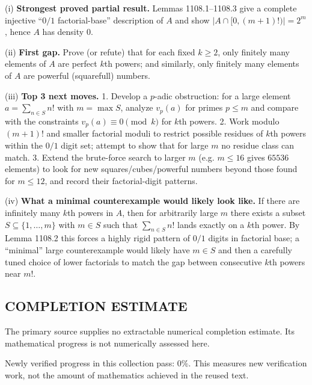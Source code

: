 (i) \textbf{Strongest proved partial result.}
Lemmas 1108.1--1108.3 give a complete injective ``$0/1$ factorial-base'' description of $A$ and show $|A\cap[0,(m+1)! )|=2^m$, hence $A$ has density $0$.

(ii) \textbf{First gap.}
Prove (or refute) that for each fixed $k\ge 2$, only finitely many elements of $A$ are perfect $k$th powers; and similarly, only finitely many elements of $A$ are powerful (squarefull) numbers.

(iii) \textbf{Top 3 next moves.}
1. Develop a $p$-adic obstruction: for a large element $a=\sum_{n\in S}n!$ with $m=\max S$, analyze $v_p(a)$ for primes $p\le m$ and compare with the constraints $v_p(a)\equiv 0\pmod{k}$ for $k$th powers.
2. Work modulo $(m+1)!$ and smaller factorial moduli to restrict possible residues of $k$th powers within the $0/1$ digit set; attempt to show that for large $m$ no residue class can match.
3. Extend the brute-force search to larger $m$ (e.g. $m\le 16$ gives $65536$ elements) to look for new squares/cubes/powerful numbers beyond those found for $m\le 12$, and record their factorial-digit patterns.

(iv) \textbf{What a minimal counterexample would likely look like.}
If there are infinitely many $k$th powers in $A$, then for arbitrarily large $m$ there exists a subset $S\subseteq\{1,\dots,m\}$ with $m\in S$ such that $\sum_{n\in S} n!$ lands exactly on a $k$th power. By Lemma 1108.2 this forces a highly rigid pattern of $0/1$ digits in factorial base; a ``minimal'' large counterexample would likely have $m\in S$ and then a carefully tuned choice of lower factorials to match the gap between consecutive $k$th powers near $m!$.




\subsection*{COMPLETION ESTIMATE}
The primary source supplies no extractable numerical completion estimate. Its mathematical progress is not numerically assessed here.

Newly verified progress in this collection pass: $0\%$. This measures new verification work, not the amount of mathematics achieved in the reused text.

